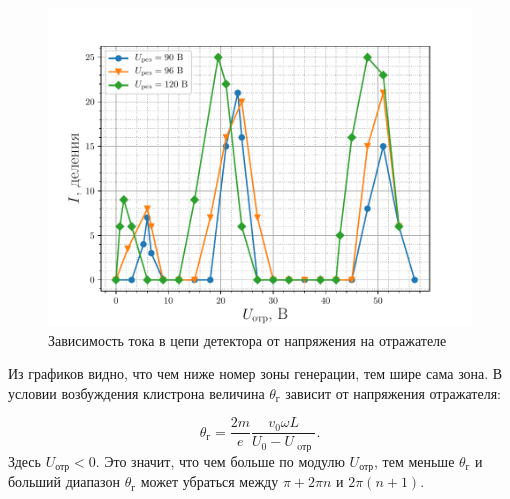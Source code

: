 
\begin{figure}[h!]
		\centering
		\includegraphics[width=\linewidth]{fig/task3a}
		\caption{Зависимость тока в цепи детектора от напряжения на отражателе}
		\label{fig:task3a}
\end{figure}
 
 Из графиков видно, что чем ниже номер зоны генерации, тем шире сама зона. В условии возбуждения клистрона величина $\theta _ { \text{г} }$ зависит от напряжения отражателя:

  $$\theta _ { \text{г} } = \frac { 2 m } { e } \frac { v _ { 0 } \omega L } { U _ { 0 } - U _ { \text{ oтр } } }.$$ 
  Здесь $U_{\text{отр}}<0$. Это значит, что чем больше по модулю $U_{\text{отр}}$, тем меньше $\theta _ { \text{г} }$ и больший диапазон $\theta _ { \text{г} }$ может убраться между $\pi+ 2\pi n$ и $2\pi(n+1)$.

